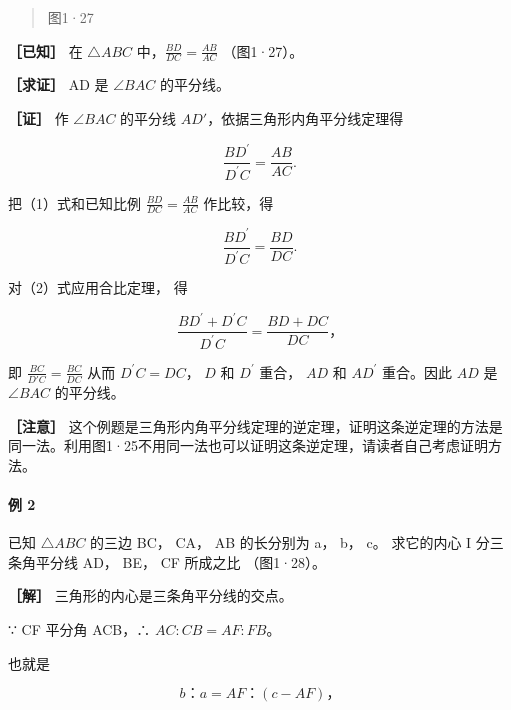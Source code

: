 \begin{quote}
图1·27
\end{quote}

\textbf{［已知］} 在 \(\triangle ABC\)
中，\(\frac{BD}{DC} = \frac{AB}{AC}\) （图1·27）。

\textbf{［求证］} AD 是 \(\angle BAC\) 的平分线。

\textbf{［证］} 作 \(\angle BAC\) 的平分线
\(AD'\)，依据三角形内角平分线定理得

\[
\frac {B D ^ {\prime}}{D ^ {\prime} C} = \frac {A B}{A C}. \tag {1}
\]

把（1）式和已知比例 \(\frac{BD}{DC} = \frac{AB}{AC}\) 作比较，得

\[
\frac {B D ^ {\prime}}{D ^ {\prime} C} = \frac {B D}{D C}. \tag {2}
\]

对（2）式应用合比定理， 得

\[
\frac {B D ^ {\prime} + D ^ {\prime} C}{D ^ {\prime} C} = \frac {B D + D C}{D C}\text{，}
\]

即 \(\frac{BC}{D'C} = \frac{BC}{DC}\) 从而 \(D^{\prime}C = DC\)， \(D\)
和 \(D^{\prime}\) 重合， \(AD\) 和 \(AD^{\prime}\) 重合。因此 \(AD\) 是
\(\angle BAC\) 的平分线。

\textbf{［注意］}
这个例题是三角形内角平分线定理的逆定理，证明这条逆定理的方法是同一法。利用图1·25不用同一法也可以证明这条逆定理，请读者自己考虑证明方法。

\paragraph{例 2}

已知 \(\triangle ABC\) 的三边 BC， CA， AB 的长分别为 a， b， c。
求它的内心 I 分三条角平分线 AD， BE， CF 所成之比 （图1·28）。

\textbf{［解］} 三角形的内心是三条角平分线的交点。

∵ CF 平分角 ACB，∴ \(AC:CB = AF:FB\)。

也就是

\[
b\text{：} a = A F\text{：} (c - A F)\text{，}
\]

